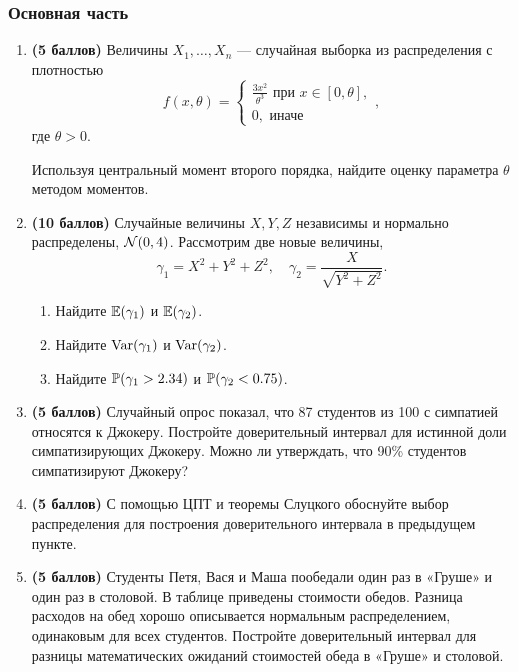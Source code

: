 \subsubsection*{Основная часть}


\begin{enumerate}
  
  \item \textbf{(5 баллов)} Величины $X_1, \dots, X_n$ — случайная выборка из распределения с плотностью
  \begin{equation*}
  f(x, \theta) = 
   \begin{cases}
     \frac{3x^2}{\theta^3} \text{ при } x \in [0,\theta],\\
     0, \text{ иначе}
   \end{cases},
  \end{equation*}
  где $\theta > 0$. 
  
  Используя центральный момент второго порядка, найдите оценку параметра $\theta$ методом моментов.
  
  \item \textbf{(10 баллов)} Случайные величины $X, Y, Z$ независимы и нормально распределены, $\cN(0, 4)$.
  Рассмотрим две новые величины,
  \[
  \gamma_1 = X^2 + Y^2 + Z^2, \quad \gamma_2 = \frac{X}{\sqrt{Y^2 + Z^2}}.
  \]
  
  \begin{enumerate}
    \item Найдите $\E(\gamma_1)$ и $\E(\gamma_2)$.
    \item Найдите $\Var(\gamma_1)$ и $\Var(\gamma_2)$.
    \item Найдите $\P(\gamma_1 > 2.34)$ и $\P(\gamma_2 < 0.75)$.
  \end{enumerate}
  
  \item \textbf{(5 баллов)} Случайный опрос показал, что 87 студентов из 100 с симпатией относятся к Джокеру. Постройте доверительный интервал для истинной доли симпатизирующих Джокеру. Можно ли утверждать, что 90\% студентов симпатизируют Джокеру? 
  
  \item \textbf{(5 баллов)} С помощью ЦПТ и теоремы Слуцкого обоснуйте выбор распределения для построения доверительного интервала в предыдущем пункте.
  
  \item \textbf{(5 баллов)} Студенты Петя, Вася и Маша пообедали один раз в «Груше» и один раз в столовой. 
  В таблице приведены стоимости обедов. 
  Разница расходов на обед хорошо описывается нормальным распределением, одинаковым для всех студентов. 
  Постройте доверительный интервал для разницы математических ожиданий стоимостей обеда в «Груше» и столовой.


\end{enumerate}
